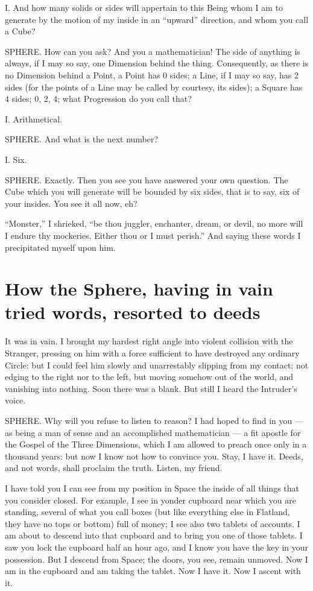 \documentclass[12pt, a4paper, oneside]{memoir}
\begin{document}
I. And how many solids or sides will appertain to this Being whom I am to
generate by the motion of my inside in an ``upward'' direction, and whom you
call a Cube?

SPHERE. How can you ask? And you a mathematician! The side of anything is
always, if I may so say, one Dimension behind the thing. Consequently, as
there is no Dimension behind a Point, a Point has 0 sides; a Line, if I may so
say, has 2 sides (for the points of a Line may be called by courtesy, its
sides); a Square has 4 sides; 0, 2, 4; what Progression do you call that?

I. Arithmetical.

SPHERE. And what is the next number?

I. Six.

SPHERE. Exactly. Then you see you have answered your own question. The Cube
which you will generate will be bounded by six sides, that is to say, six of
your insides. You see it all now, eh?

``Monster,'' I shrieked, ``be thou juggler, enchanter, dream, or devil, no more
will I endure thy mockeries. Either thou or I must perish.'' And saying these
words I precipitated myself upon him.



\chapter{How the Sphere, having in vain
tried words, resorted to deeds}
It was in vain. I brought my hardest right angle into violent collision with
the Stranger, pressing on him with a force sufficient to have destroyed any
ordinary Circle: but I could feel him slowly and unarrestably slipping from my
contact; not edging to the right nor to the left, but moving somehow out of
the world, and vanishing into nothing. Soon there was a blank. But still I
heard the Intruder's voice.

SPHERE. Why will you refuse to listen to reason? I had hoped to find in you ---
as being a man of sense and an accomplished mathematician --- a fit apostle for
the Gospel of the Three Dimensions, which I am allowed to preach once only in
a thousand years: but now I know not how to convince you. Stay, I have it.
Deeds, and not words, shall proclaim the truth. Listen, my friend.

I have told you I can see from my position in Space the inside of all things
that you consider closed. For example, I see in yonder cupboard near which you
are standing, several of what you call boxes (but like everything else in
Flatland, they have no tops or bottom) full of money; I see also two tablets
of accounts. I am about to descend into that cupboard and to bring you one of
those tablets. I saw you lock the cupboard half an hour ago, and I know you
have the key in your possession. But I descend from Space; the doors, you see,
remain unmoved. Now I am in the cupboard and am taking the tablet. Now I have
it. Now I ascent with it.
\end{document}
